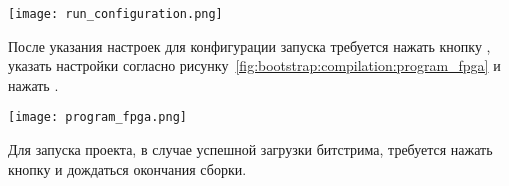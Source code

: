 \begin{center}
  \centering
  \texttt{[image: run\_configuration.png]}
  \label{fig:bootstrap:compilation:run_configuration}
\end{center}

После указания настроек для конфигурации запуска требуется нажать кнопку ,
указать настройки согласно рисунку~\ref{fig:bootstrap:compilation:program_fpga} и нажать
.

\begin{center}
  \centering
  \texttt{[image: program\_fpga.png]}
  \label{fig:bootstrap:compilation:program_fpga}
\end{center}

Для запуска проекта, в случае успешной загрузки битстрима, требуется нажать кнопку  и
дождаться окончания сборки.
